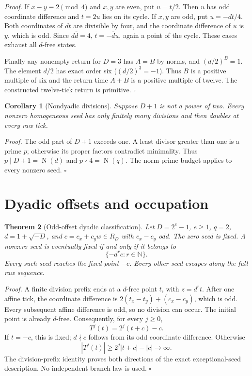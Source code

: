 \documentclass[11pt,letterpaper]{article}
\newcommand{\N}{\mathbb{N}}
\newtheorem{theorem}{Theorem}
\newtheorem{corollary}[theorem]{Corollary}
\newenvironment{proof}{\noindent\textit{Proof.}}{\hfill\(\square\)}
\newcommand{\OrderNorm}{\operatorname{N}}
\newcommand{\RawMap}{T}
\begin{document}
\begin{proof}
If \(x-y\equiv2\pmod4\) and \(x,y\) are even, put \(u=t/2\).
Then \(u\) has odd coordinate difference and \(t=2u\) lies on its cycle.
If \(x,y\) are odd, put \(u=-dt/4\).
Both coordinates of \(dt\) are divisible by four, and the coordinate
difference of \(u\) is \(y\), which is odd. Since \(d\bar d=4\),
\(t=-\bar d u\), again a point of the cycle.
These cases exhaust all \(d\)-free states.

Finally any nonempty return for \(D=3\) has \(A=B\) by norms, and
\((d/2)^B=1\). The element \(d/2\) has exact order six
(\((d/2)^3=-1\)). Thus \(B\) is a positive multiple of six and the
return time \(A+B\) is a positive multiple of twelve.
The constructed twelve-tick return is primitive.
\end{proof}

\begin{corollary}[Nondyadic divisions]
Suppose \(D+1\) is not a power of two. Every nonzero homogeneous seed
has only finitely many divisions and then doubles at every raw tick.
\end{corollary}
\begin{proof}
The odd part of \(D+1\) exceeds one. A least divisor greater than one
is a prime \(p\); otherwise its proper factors contradict minimality.
Thus \(p\mid D+1=\OrderNorm(d)\) and \(p\nmid4=\OrderNorm(q)\).
The norm-prime budget applies to every nonzero seed.
\end{proof}

\section{Dyadic offsets and occupation}

\begin{theorem}[Odd-offset dyadic classification]
Let \(D=2^e-1\), \(e\ge1\), \(q=2\), \(d=1+\sqrt{-D}\), and
\(c=c_x+c_yw\in R_D\) with \(c_x-c_y\) odd.
The zero seed is fixed. A nonzero seed is eventually fixed if and
only if it belongs to
\[
\{-d^r c:r\in\N\}.
\]
Every such seed reaches the fixed point \(-c\).
Every other seed escapes along the full raw sequence.
\end{theorem}
\begin{proof}
A finite division prefix ends at a \(d\)-free point \(t\), with
\(z=d^r t\). After one affine tick, the coordinate difference is
\(2(t_x-t_y)+(c_x-c_y)\), which is odd. Every subsequent affine
difference is odd, so no division can occur. The initial point
is already \(d\)-free. Consequently, for every \(j\ge0\),
\[
\RawMap^j(t)=2^j(t+c)-c.
\]
If \(t=-c\), this is fixed; \(d\nmid c\) follows from its odd
coordinate difference. Otherwise
\[
|\RawMap^j(t)|\ge2^j|t+c|-|c|\longrightarrow\infty.
\]
The division-prefix identity proves both directions of the exact
exceptional-seed description. No independent branch law is used.
\end{proof}
\end{document}
